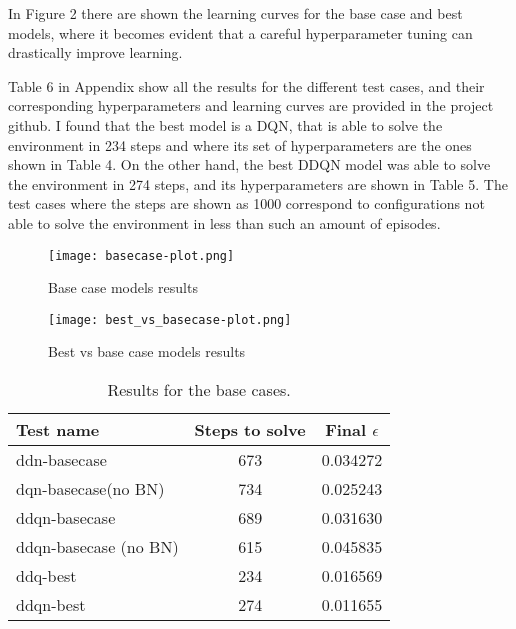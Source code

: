 \documentclass{article}
\begin{document}
In Figure 2 there are shown the learning curves for the base case and best models, where it becomes evident that a careful hyperparameter tuning can drastically improve learning.

Table 6 in Appendix show all the results for the different test cases, and their corresponding hyperparameters and learning curves are provided in the project github. I found that the best model is a DQN, that is able to solve the environment in 234 steps and where its set of hyperparameters are the ones shown in Table 4. On the other hand, the best DDQN model was able to solve the environment in 274 steps, and its hyperparameters are shown in Table 5. The test cases where the steps are shown as 1000 correspond to configurations not able to solve the environment in less than such an amount of episodes. 

\begin{figure}[h!]
\texttt{[image: basecase-plot.png]}
\centering
\caption{Base case models results}
\label{fig:mesh1}
\end{figure}

\begin{figure}[h!]
\texttt{[image: best\_vs\_basecase-plot.png]}
\centering
\caption{Best vs base case models results}
\label{fig:mesh1}
\end{figure}

\begin{table}[h!]
\centering
\begin{tabular}{lcc}
\toprule
Test name & Steps to solve  & Final  $\epsilon$ \\
\midrule
ddn-basecase &  673 &	0.034272 \\
dqn-basecase(no BN)  & 734 & 0.025243\\
ddqn-basecase & 689  & 0.031630 \\
ddqn-basecase (no BN)  & 615 &  0.045835 \\
ddq-best & 234  & 0.016569 \\
ddqn-best & 274 &  0.011655 \\
\bottomrule
\end{tabular}
\label{table:res_basecase}
\caption{Results for the base cases.}
\end{table}
\end{document}
